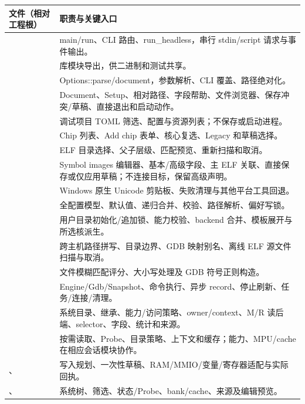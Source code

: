 \documentclass[UTF8,a4paper,11pt,oneside,fontset=none]{ctexart}
\begin{document}
\begin{longtable}{@{}P{55mm}P{106mm}@{}}\toprule
文件（相对工程根） & 职责与关键入口\\\midrule\endhead
{} & main/run、CLI 路由、run\_headless，串行 stdin/script 请求与事件输出。\\
 & 库模块导出，供二进制和测试共享。\\
 & Options::parse/document，参数解析、CLI 覆盖、路径绝对化。\\
 & Document、Setup、相对路径、字段帮助、文件浏览器、保存冲突/草稿、直接退出和启动动作。\\
 & 调试项目 TOML 筛选、配置与资源列表；不保存或启动进程。\\
 & Chip 列表、Add chip 表单、核心复选、Legacy 和草稿选择。\\
 & ELF 目录选择、父子层级、匹配预览、重新扫描和取消。\\
 & Symbol images 编辑器、基本/高级字段、主 ELF 关联、直接保存或仅应用草稿；不连接目标，保留高级声明。\\
 & Windows 原生 Unicode 剪贴板、失败清理与其他平台工具回退。\\
 & 全配置模型、默认值、递归合并、校验、路径解析、偏好写锁。\\
 & 用户目录初始化/追加锁、能力校验、backend 合并、模板展开与所选核派生。\\
 & 跨主机路径拼写、目录边界、GDB 映射别名、离线 ELF 源文件扫描与取消。\\
 & 文件模糊匹配评分、大小写处理及 GDB 符号正则构造。\\
 & Engine/Gdb/Snapshot、命令执行、异步 record、停止刷新、任务/连接/清理。\\
 & 系统目录、继承、能力/访问策略、owner/context、M/R 读后端、selector、字段、统计和来源。\\
 & 按需读取、Probe、目录策略、上下文和缓存；能力、MPU/cache 在相应会话模块协作。\\
、 & 写入规划、一次性草稿、RAM/MMIO/变量/寄存器适配与实际回执。\\
、 & 系统树、筛选、状态/Probe、bank/cache、来源及编辑预览。\\

\end{longtable}
\end{document}
